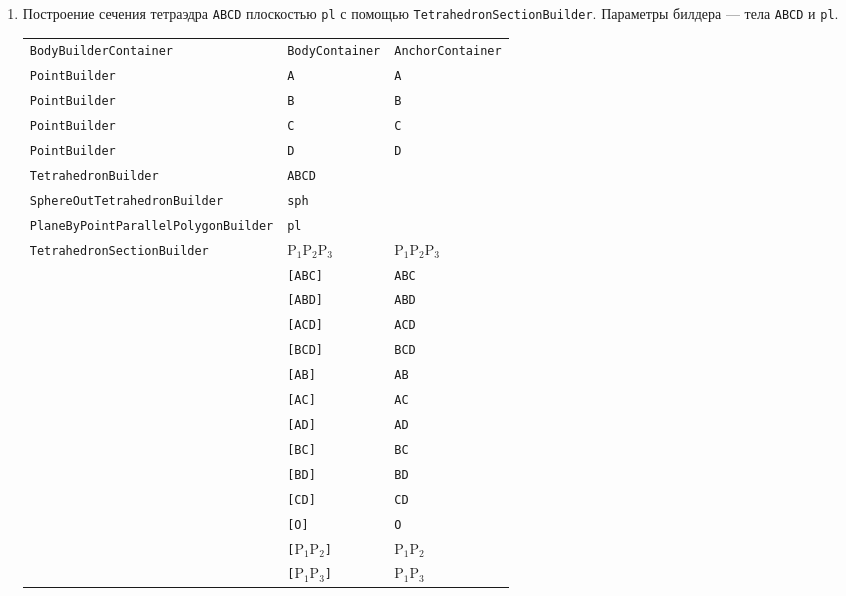 \documentclass[fontsize=10px, a4paper, openany]{scrbook}
\begin{document}
\begin{enumerate}
\pagebreak

\item Построение сечения тетраэдра \texttt{ABCD} плоскостью \texttt{pl} с помощью \texttt{TetrahedronSectionBuilder}. Параметры билдера --- тела \texttt{ABCD} и \texttt{pl}.

\begin{table}[h!]
\centering
\begin{tabular}{lll}
\texttt{BodyBuilderContainer}                 & \texttt{BodyContainer} & \texttt{AnchorContainer} \\
\texttt{PointBuilder} & \texttt{A}    & \texttt{A}      \\
\texttt{PointBuilder} & \texttt{B}    & \texttt{B}      \\
\texttt{PointBuilder} & \texttt{C}    & \texttt{C}      \\
\texttt{PointBuilder} & \texttt{D}    & \texttt{D}      \\
\texttt{TetrahedronBuilder} & \texttt{ABCD} & \\
\texttt{SphereOutTetrahedronBuilder} & \texttt{sph}              & \\
\texttt{PlaneByPointParallelPolygonBuilder} & \texttt{pl} & \\
\cellcolor[HTML]{68CBD0}\texttt{TetrahedronSectionBuilder} & \cellcolor[HTML]{68CBD0}\texttt{$\text{P}_1\text{P}_2\text{P}_3$} & \cellcolor[HTML]{68CBD0}\texttt{$\text{P}_1\text{P}_2\text{P}_3$}\\
 & \texttt{[ABC]} & \texttt{ABC} \\
 & \texttt{[ABD]} & \texttt{ABD} \\
 & \texttt{[ACD]} & \texttt{ACD} \\
 & \texttt{[BCD]} & \texttt{BCD} \\
 & \texttt{[AB]} & \texttt{AB} \\
 & \texttt{[AC]} & \texttt{AC} \\
 & \texttt{[AD]} & \texttt{AD} \\
 & \texttt{[BC]} & \texttt{BC} \\
 & \texttt{[BD]} & \texttt{BD} \\
 & \texttt{[CD]} & \texttt{CD} \\
 & \texttt{[O]}  & \texttt{O} \\
 & \cellcolor[HTML]{68CBD0}\texttt{[$\text{P}_1\text{P}_2$]} & \cellcolor[HTML]{68CBD0}\texttt{$\text{P}_1\text{P}_2$} \\
 & \cellcolor[HTML]{68CBD0}\texttt{[$\text{P}_1\text{P}_3$]} & \cellcolor[HTML]{68CBD0}\texttt{$\text{P}_1\text{P}_3$} \\

\end{tabular}
\end{table}
\end{enumerate}
\end{document}
